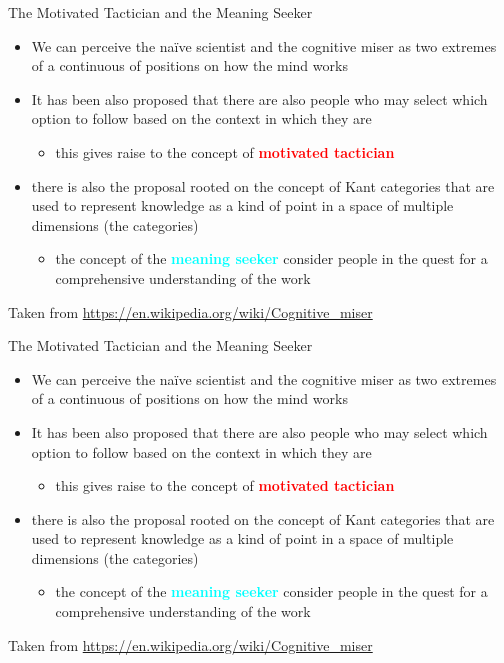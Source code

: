 \documentclass{beamer}
\begin{document}
\begin{frame}
{\centerline{The Motivated Tactician and the Meaning Seeker}}
\begin{itemize}
    \item We can perceive the na\"{i}ve scientist and the cognitive miser as two extremes of a continuous of positions on how the mind works
   \item It has been also proposed that there are also people who may select which option to follow based on the context in which they are
   \begin{itemize}
   \item this gives raise to the concept of \textcolor{red}{\bf motivated tactician}
   \end{itemize} 
   \item there is also the proposal rooted on the concept of Kant categories that are used to represent knowledge as a kind of point in a space of multiple dimensions (the categories)
   \begin{itemize}
   \item the concept of the \textcolor{cyan}{\bf meaning seeker} consider people in the quest for a comprehensive understanding of the work
\end{itemize} 
\end{itemize} 
\begin{center}
    \tiny{Taken from \url{https://en.wikipedia.org/wiki/Cognitive_miser}}
\end{center}

\end{frame}

\begin{frame}
{\centerline{The Motivated Tactician and the Meaning Seeker}}
\begin{itemize}
    \item We can perceive the na\"{i}ve scientist and the cognitive miser as two extremes of a continuous of positions on how the mind works
   \item It has been also proposed that there are also people who may select which option to follow based on the context in which they are
   \begin{itemize}
   \item this gives raise to the concept of \textcolor{red}{\bf motivated tactician}
   \end{itemize} 
   \item there is also the proposal rooted on the concept of Kant categories that are used to represent knowledge as a kind of point in a space of multiple dimensions (the categories)
   \begin{itemize}
   \item the concept of the \textcolor{cyan}{\bf meaning seeker} consider people in the quest for a comprehensive understanding of the work
\end{itemize} 
\end{itemize} 
\begin{center}
    \tiny{Taken from \url{https://en.wikipedia.org/wiki/Cognitive_miser}}
\end{center}

\end{frame}
\end{document}
